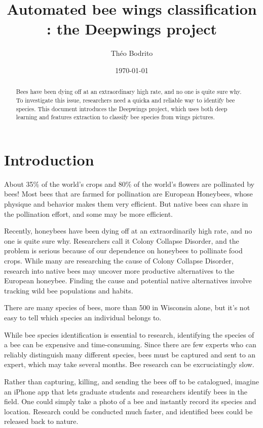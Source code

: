 \documentclass[a4paper]{article}
\title{Automated bee wings classification : the Deepwings project}
\author{Théo Bodrito}
\date{\today}
\begin{document}
\maketitle

\begin{abstract}
    Bees have been dying off at an extraordinary high rate, and no one is quite sure why. To investigate this issue, researchers need a quicka and reliable way to identify bee species. This document introduces the Deepwings project, which uses both deep learning and features extraction to classify bee species from wings pictures.


\end{abstract}

\section{Introduction}
\label{sec:introduction}

About 35\% of the world's crops and 80\% of the world’s flowers are pollinated by bees! Most bees that are farmed for pollination are European Honeybees, whose physique and behavior makes them very efficient. But native bees can share in the pollination effort, and some may be more efficient.

Recently, honeybees have been dying off at an extraordinarily high rate, and no one is quite sure why. Researchers call it Colony Collapse Disorder, and the problem is serious because of our dependence on honeybees to pollinate food crops. While many are researching the cause of Colony Collapse Disorder, research into native bees may uncover more productive alternatives to the European honeybee. Finding the cause and potential native alternatives involve tracking wild bee populations and habits.

There are many species of bees, more than 500 in Wisconsin alone, but it's not easy to tell which species an individual belongs to.

While bee species identification is essential to research, identifying the species of a bee can be expensive and time-consuming. Since there are few experts who can reliably distinguish many different species, bees must be captured and sent to an expert, which may take several months. Bee research can be excruciatingly slow.

Rather than capturing, killing, and sending the bees off to be catalogued, imagine an iPhone app that lets graduate students and researchers identify bees in the field. One could simply take a photo of a bee and instantly record its species and location. Research could be conducted much faster, and identified bees could be released back to nature.
\end{document}
